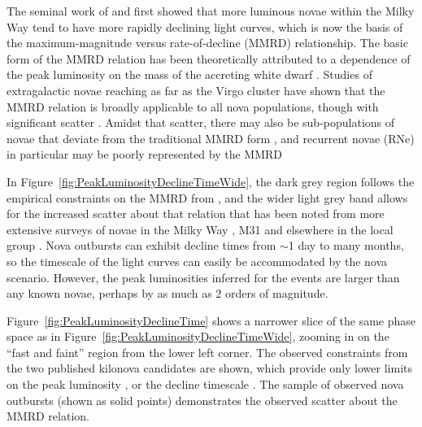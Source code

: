 The seminal work of \citet{Zwicky:1936} and \citet{McLaughlin:1939}
first showed that more luminous novae within the Milky Way tend to
have more rapidly declining light curves, which is now the basis of
the maximum-magnitude versus rate-of-decline (MMRD) relationship. The
basic form of the MMRD relation has been theoretically attributed to a
dependence of the peak luminosity on the mass of the accreting white
dwarf \citep[e.g.][]{Livio:1992}.  Studies of extragalactic novae
reaching as far as the Virgo cluster have shown that the MMRD relation
is broadly applicable to all nova populations, though with significant
scatter
\citep[e.g.][]{Ciardullo:1990,DellaValle:1995,Ferrarese:2003,Shafter:2011}.
Amidst that scatter, there may also be sub-populations of novae that
deviate from the traditional MMRD form \citep{Kasliwal:2011}, and
recurrent novae (RNe) in particular may be poorly represented by the
MMRD \citep{Shafter:2011,Hachisu:2015}

In Figure~\ref{fig:PeakLuminosityDeclineTimeWide}, the dark grey
region follows the empirical constraints on the MMRD from
\citet{DellaValle:1995}, and the wider light grey band allows for the
increased scatter about that relation that has been noted from more
extensive surveys of novae in the Milky Way \citep{Downes:2000}, M31
\citep{Shafter:2011} and elsewhere in the local group
\citep{Kasliwal:2011}.  Nova outbursts can exhibit decline times from
$\sim$1 day to many months, so the timescale of the \spock light
curves can easily be accommodated by the nova scenario. However, the
peak luminosities inferred for the \spock events are larger than any
known novae, perhaps by as much as 2 orders of magnitude.

Figure~\ref{fig:PeakLuminosityDeclineTime} shows a narrower slice of
the same phase space as in
Figure~\ref{fig:PeakLuminosityDeclineTimeWide}, zooming in on the
``fast and faint'' region from the lower left corner.  The observed
constraints from the two published kilonova candidates are shown,
which provide only lower limits on the peak luminosity
\citep{Tanvir:2013}, or the decline timescale \citep{Perley:2009}.
The sample of observed nova outbursts (shown as solid points)
demonstrates the observed scatter about the MMRD relation.  

